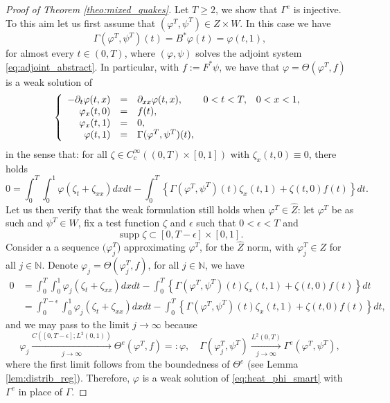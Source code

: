 \documentclass[10pt]{article}
\newcommand{\opsupp}{\operatorname{supp}}
\begin{document}
\begin{proof}[Proof of Theorem \ref{theo:mixed_quakes}]
Let $T \geq 2$, we show that $\Gamma^e$ is injective. To this aim let us first assume that $(\varphi^T , \psi^T) \in Z \times W$. In this case we have 
\[
\Gamma(\varphi^T,\psi^T)(t) = B^*\varphi(t) = \varphi(t,1),
\]
for almost every $t \in (0,T)$, where $(\varphi,\psi)$ solves the adjoint system \eqref{eq:adjoint_abstract}. In particular, with $f := F^*\psi$, we have that $\varphi = \Theta(\varphi^T,f)$ is a weak solution of
\begin{equation}\label{eq:heat_phi_smart}
\left\lbrace \begin{array}{rcl cc}
-\partial_t \varphi(t,x) &=& \partial_{xx}\varphi(t,x),& 0 < t < T, & 0 < x < 1, \\
\varphi_x(t,0) &=& f(t),\\
\varphi_x(t,1) &=& 0, \\
\varphi(t,1) &=& \Gamma(\varphi^T,\psi^T)(t),
\end{array}\right.
\end{equation}
in the sense that: for all $\zeta \in C_c^\infty((0,T) \times [0,1])$ with $\zeta_x(t,0) \equiv 0$, there holds 
\begin{equation}\label{eq:weak_phi}
0 = \int_0^T \int_0^1 \varphi (\zeta_t + \zeta_{xx}) dxdt - \int_0^T \left\lbrace \Gamma(\varphi^T,\psi^T)(t) \zeta_x(t,1) + \zeta(t,0)f(t) \right\rbrace dt.  
\end{equation}
Let us then verify that the weak formulation still holds when $\varphi^T \in \hat{Z}$: let $\varphi^T$ be as such and $\psi^T \in W$, fix a test function $\zeta$ and $\epsilon$ such that $0 < \epsilon < T$ and
\begin{equation}\label{eq:support_zeta}
\opsupp \zeta \subset [0,T-\epsilon] \times [0,1].
\end{equation}
Consider a a sequence $(\varphi^T_j$) approximating $\varphi^T$, for the $\hat{Z}$ norm, with $\varphi^T_j \in Z$ for all $j \in \mathbb{N}$. Denote $\varphi_j = \Theta(\varphi_j^T,f)$, for all $j \in \mathbb{N}$, we have 
\begin{align*}
0 &= \int_0^T \int_0^1 \varphi_j (\zeta_t + \zeta_{xx}) dxdt - \int_0^T \left\lbrace \Gamma(\varphi^T,\psi^T)(t) \zeta_x(t,1) + \zeta(t,0)f(t) \right\rbrace dt \\
&= \int_0^{T-\epsilon} \int_0^1 \varphi_j (\zeta_t + \zeta_{xx}) dxdt - \int_0^{T} \left\lbrace \Gamma(\varphi^T,\psi^T)(t) \zeta_x(t,1) + \zeta(t,0)f(t) \right\rbrace dt,
\end{align*}
and we may pass to the limit $j \to \infty$ because
\[
\varphi_j \xrightarrow[j \rightarrow \infty]{C([0,T-\epsilon] ; L^2(0,1))} \Theta^e(\varphi^T,f) =: \varphi, \quad \Gamma(\varphi^T_j,\psi^T) \xrightarrow[j \rightarrow \infty]{L^2(0,T)} \Gamma^e(\varphi^T,\psi^T),
\]
where the first limit follows from the boundedness of $\Theta^e$ (see Lemma \ref{lem:distrib_reg}). Therefore, $\varphi$ is a weak solution of \eqref{eq:heat_phi_smart} with $\Gamma^e$ in place of $\Gamma$. 


\end{proof}
\end{document}
